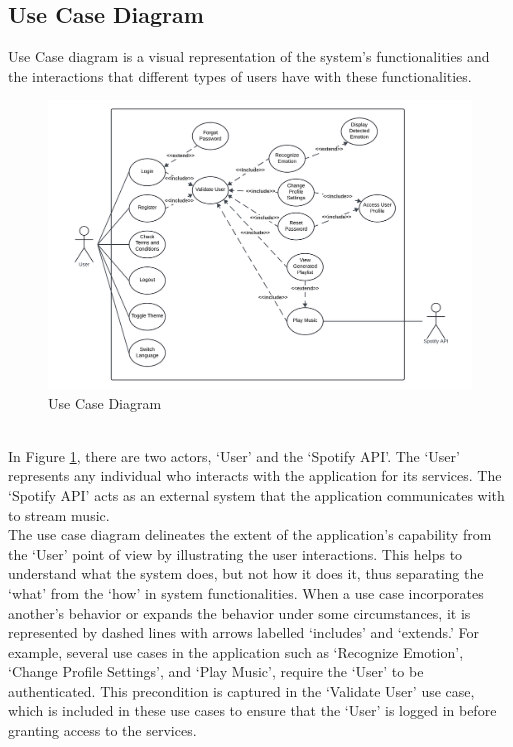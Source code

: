 \subsection{Use Case Diagram}
Use Case diagram is a visual representation of the system's functionalities and the interactions that different types of users have with these functionalities. \citep{ibm_2021_usecase}
\begin{figure}[!ht]
    \centering
    \includegraphics[width=14cm]{Images/usecase.png}
    \caption{Use Case Diagram}
    \label{fig:usecase}
\end{figure}
\\
\indent In Figure \ref{fig:usecase}, there are two actors, `User' and the `Spotify API'.
The `User' represents any individual who interacts with the application for its services.
The `Spotify API' acts as an external system that the application communicates with to stream music.
\\
\indent The use case diagram delineates the extent of the application's capability from the `User' point of view by illustrating the user interactions.
This helps to understand what the system does, but not how it does it, thus separating the `what' from the `how' in system functionalities.
When a use case incorporates another's behavior or expands the behavior under some circumstances, it is represented by dashed lines with arrows labelled `includes' and `extends.'
For example, several use cases in the application such as `Recognize Emotion', `Change Profile Settings', and `Play Music', require the `User' to be authenticated.
This precondition is captured in the `Validate User' use case, which is included in these use cases to ensure that the `User' is logged in before granting access to the services.
\\
